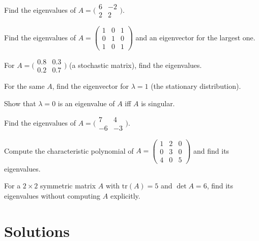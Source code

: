 \begin{problems}
  \item Find the eigenvalues of $A = \bigl(\begin{smallmatrix} 6 & -2 \\ 2 & 2 \end{smallmatrix}\bigr)$.
  \item Find the eigenvalues of $A = \begin{pmatrix} 1 & 0 & 1 \\ 0 & 1 & 0 \\ 1 & 0 & 1 \end{pmatrix}$ and an eigenvector for the largest one.
  \item For $A = \bigl(\begin{smallmatrix} 0.8 & 0.3 \\ 0.2 & 0.7 \end{smallmatrix}\bigr)$ (a stochastic matrix), find the eigenvalues.
  \item For the same $A$, find the eigenvector for $\lambda = 1$ (the stationary distribution).
  \item Show that $\lambda = 0$ is an eigenvalue of $A$ iff $A$ is singular.
  \item Find the eigenvalues of $A = \bigl(\begin{smallmatrix} 7 & 4 \\ -6 & -3 \end{smallmatrix}\bigr)$.
  \item Compute the characteristic polynomial of $A = \begin{pmatrix} 1 & 2 & 0 \\ 0 & 3 & 0 \\ 4 & 0 & 5 \end{pmatrix}$ and find its eigenvalues.
  \item For a $2 \times 2$ symmetric matrix $A$ with $\mathrm{tr}(A) = 5$ and $\det A = 6$, find its eigenvalues without computing $A$ explicitly.
\end{problems}

\section{Solutions}

